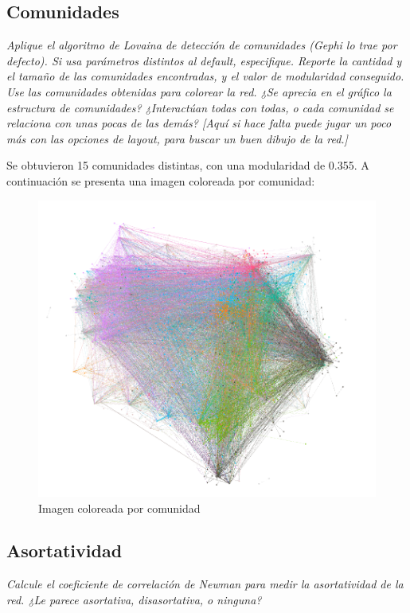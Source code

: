 \documentclass[12pt]{article}
\begin{document}
\subsection{Comunidades} 
\textit{Aplique el algoritmo de Lovaina de detección de comunidades (Gephi lo trae por defecto). Si usa parámetros distintos al default, especifique. Reporte la cantidad y el tamaño de las comunidades encontradas, y el valor de modularidad conseguido. Use las comunidades obtenidas para colorear la red. ¿Se aprecia en el gráfico la estructura de comunidades? ¿Interactúan todas con todas, o cada comunidad se relaciona con unas pocas de las demás? [Aquí si hace falta puede jugar un poco más con las opciones de layout, para buscar un buen dibujo de la red.]}

Se obtuvieron 15 comunidades distintas, con una modularidad de 0.355. A continuación se presenta una imagen coloreada por comunidad:

\begin{figure}[H]
    \begin{center}
        \includegraphics[scale=0.4]{images/red_comunidades.png}
    \end{center}
    \caption{Imagen coloreada por comunidad}
    \label{fig:drawing-community}
\end{figure}
\subsection{Asortatividad}
\textit{Calcule el coeficiente de correlación de Newman para medir la asortatividad de la red. ¿Le parece asortativa, disasortativa, o ninguna?}
\end{document}
